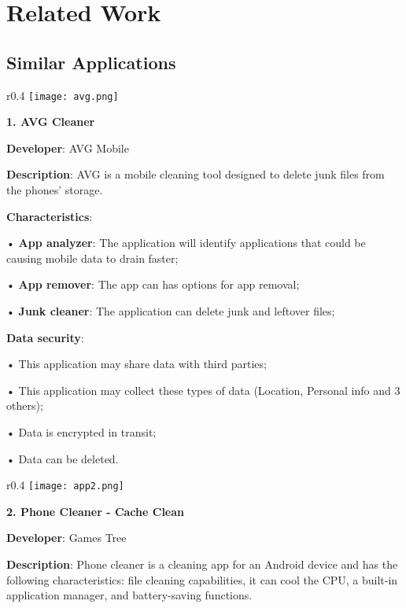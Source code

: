 
\chapter{Related Work}\label{chapter:chap3}

\section{Similar Applications}\label{sect:similar applications}

\begin{wrapfigure}{r}{0.4\textwidth} 
    \centering
    \texttt{[image: avg.png]}
\end{wrapfigure}

\textbf{1. AVG Cleaner}

\textbf{Developer}: AVG Mobile

\textbf{Description}: AVG is a mobile cleaning tool designed to delete junk files from the phones' storage.

\textbf{Characteristics}:

• \textbf{App analyzer}: The application will identify applications that could be causing mobile data to drain faster;

• \textbf{App remover}: The app can has options for app removal;

• \textbf{Junk cleaner}: The application can delete junk and leftover files;

\textbf{Data security}:

• This application may share data with third parties;

• This application may collect these types of data (Location, Personal info and 3 others);

• Data is encrypted in transit;

• Data can be deleted.\newline

\begin{wrapfigure}{r}{0.4\textwidth} 
    \centering
    \texttt{[image: app2.png]}
\end{wrapfigure}

\noindent 
\textbf{2. Phone Cleaner - Cache Clean}

\textbf{Developer}: Games Tree

\textbf{Description}: Phone cleaner is a cleaning app for an Android device and has the following characteristics: file cleaning capabilities, it can cool the CPU, a built-in application manager, and battery-saving functions.

